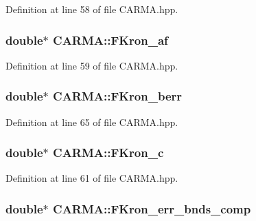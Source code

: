 Definition at line 58 of file C\-A\-R\-M\-A.\-hpp.

\hypertarget{class_c_a_r_m_a_afb5265a4a649bda74d75346703633bd5}{
\subsubsection[{F\-Kron\-\_\-af}]{\setlength{\rightskip}{0pt plus 5cm}double$\ast$ C\-A\-R\-M\-A\-::\-F\-Kron\-\_\-af}}\label{class_c_a_r_m_a_afb5265a4a649bda74d75346703633bd5}


Definition at line 59 of file C\-A\-R\-M\-A.\-hpp.

\hypertarget{class_c_a_r_m_a_acae4a7d06cd91dfc10cf0c1bf87f6689}{
\subsubsection[{F\-Kron\-\_\-berr}]{\setlength{\rightskip}{0pt plus 5cm}double$\ast$ C\-A\-R\-M\-A\-::\-F\-Kron\-\_\-berr}}\label{class_c_a_r_m_a_acae4a7d06cd91dfc10cf0c1bf87f6689}


Definition at line 65 of file C\-A\-R\-M\-A.\-hpp.

\hypertarget{class_c_a_r_m_a_ae051792220350a8ca5bf9619d97351ac}{
\subsubsection[{F\-Kron\-\_\-c}]{\setlength{\rightskip}{0pt plus 5cm}double$\ast$ C\-A\-R\-M\-A\-::\-F\-Kron\-\_\-c}}\label{class_c_a_r_m_a_ae051792220350a8ca5bf9619d97351ac}


Definition at line 61 of file C\-A\-R\-M\-A.\-hpp.

\hypertarget{class_c_a_r_m_a_ac95cc03cafb7ce94ecccf055462b487a}{
\subsubsection[{F\-Kron\-\_\-err\-\_\-bnds\-\_\-comp}]{\setlength{\rightskip}{0pt plus 5cm}double$\ast$ C\-A\-R\-M\-A\-::\-F\-Kron\-\_\-err\-\_\-bnds\-\_\-comp}}\label{class_c_a_r_m_a_ac95cc03cafb7ce94ecccf055462b487a}


